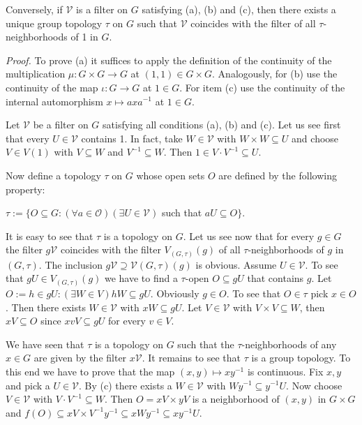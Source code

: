 \documentclass[12pt]{article}
\begin{document}
    Conversely, if $\mathcal{V}$ is a filter on $G$ satisfying (a), (b) and (c), then there exists a unique group topology $\tau$ on
$G$ such that $\mathcal{V}$ coincides with the filter of all $\tau$-neighborhoods of 1 in $G$.


\emph{Proof.} To prove (a) it suffices to apply the definition of the continuity of the multiplication $\mu : G \times G \to G$ at
$(1, 1) \in G \times G$. Analogously, for (b) use the continuity of the map $\iota : G \to G$ at $1 \in G$. For item (c) use the
continuity of the internal automorphism $x \mapsto axa^{-1}$ at $1 \in G$.


Let $\mathcal{V}$ be a filter on $G$ satisfying all conditions (a), (b) and (c). Let us see first that every $U \in \mathcal{V}$ contains 1.
In fact, take $W \in \mathcal{V}$ with $W \times W \subseteq U$ and choose $V \in V(1)$ with $V \subseteq W$ and $V^{-1} \subseteq W$. Then $1 \in V · V^{-1} \subseteq U$.


Now define a topology $\tau$ on $G$ whose open sets $O$ are defined by the following property:


$\tau := \{O \subseteq G : (\forall a \in \mathcal{O})(\exists U \in \mathcal{V})$ such that $aU \subseteq O\}$.


    It is easy to see that $\tau$ is a topology on $G$. Let us see now that for every $g \in G$ the filter $g \mathcal{V}$ coincides with the filter
$V_{(G,\tau)}(g)$ of all $\tau$-neighborhoods of $g$ in $(G, \tau)$. The inclusion $g\mathcal{V} \supseteq \mathcal{V}(G,\tau)(g)$ is obvious. Assume $U \in \mathcal{V}$. To see
that $gU \in V_{(G,\tau)}(g)$ we have to find a $\tau$-open $O \subseteq gU$ that contains $g$. Let $O := {h \in gU : (\exists W \in V) hW \subseteq gU}$.
Obviously $g \in O$. To see that $O \in \tau$ pick $x \in O$. Then there exists $W \in \mathcal{V}$ with $xW \subseteq gU$. Let $V \in \mathcal{V}$ with
$V \times V \subseteq W$, then $xV \subseteq O$ since $xvV \subseteq gU$ for every $v \in V$.


    We have seen that $\tau$ is a topology on $G$ such that the $\tau$-neighborhoods of any $x \in G$ are given by the filter
$x \mathcal{V}$. It remains to see that $\tau$ is a group topology. To this end we have to prove that the map $(x, y) \mapsto xy^{-1}$ is
continuous. Fix $x, y$ and pick a $U \in \mathcal{V}$. By (c) there exists a $W \in \mathcal{V}$ with $W y^{-1} \subseteq y^{-1}U$. Now choose $V \in \mathcal{V}$
with $V · V^{-1} \subseteq W$. Then $O = xV \times yV$ is a neighborhood of $(x, y)$ in $G \times G$ and $f(O) \subseteq xV \times V^{-1}y^{-1} \subseteq xW y^{-1} \subseteq xy^{-1}U$.
\end{document}
